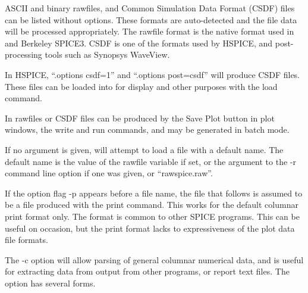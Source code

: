ASCII and binary rawfiles, and Common Simulation Data Format (CSDF)
files can be listed without options.  These formats are auto-detected
and the file data will be processed appropriately.  The rawfile format
is the native format used in {\WRspice} and Berkeley SPICE3.  CSDF is
one of the formats used by HSPICE, and post-processing tools such as
Synopsys WaveView.

In HSPICE, ``{\vt .options csdf=1}'' and ``{\vt .options post=csdf}''
will produce CSDF files.  These files can be loaded into {\WRspice}
for display and other purposes with the {\cb load} command.

In {\WRspice} rawfiles or CSDF files can be produced by the {\cb Save
Plot} button in {\cb plot} windows, the {\cb write} and {\cb run}
commands, and may be generated in batch mode.

If no argument is given, {\WRspice} will attempt to load a file with a
default name.  The default name is the value of the {\et rawfile}
variable if set, or the argument to the {\vt -r} command line option
if one was given, or ``{\vt rawspice.raw}''.

If the option flag {\vt -p} appears before a file name, the file that
follows is assumed to be a file produced with the {\WRspice} {\cb
print} command.  This works for the default columnar print format
only.  The format is common to other SPICE programs.  This can be
useful on occasion, but the print format lacks to expressiveness of
the plot data file formats.

The {\vt -c} option will allow parsing of general columnar numerical
data, and is useful for extracting data from output from other
programs, or report text files.  The option has several forms.

